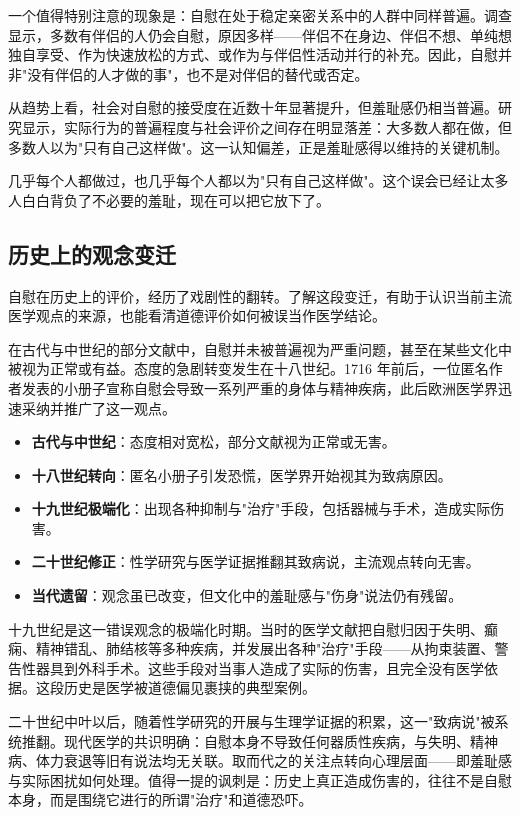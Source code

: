 \documentclass[12pt,UTF8]{ctexbook}
\newcommand{\keyword}[1]{\textbf{#1}}
\begin{document}
一个值得特别注意的现象是：自慰在处于稳定亲密关系中的人群中同样普遍。调查显示，多数有伴侣的人仍会自慰，原因多样——伴侣不在身边、伴侣不想、单纯想独自享受、作为快速放松的方式、或作为与伴侣性活动并行的补充。因此，自慰并非"没有伴侣的人才做的事"，也不是对伴侣的替代或否定。

从趋势上看，社会对自慰的接受度在近数十年显著提升，但羞耻感仍相当普遍。研究显示，实际行为的普遍程度与社会评价之间存在明显落差：大多数人都在做，但多数人以为"只有自己这样做"。这一认知偏差，正是羞耻感得以维持的关键机制。

\begin{tcolorbox}[colback=pink!5!white,colframe=red!50!black,title=贴心小叮咛]
	几乎每个人都做过，也几乎每个人都以为"只有自己这样做"。这个误会已经让太多人白白背负了不必要的羞耻，现在可以把它放下了。
\end{tcolorbox}
\subsection{历史上的观念变迁}

自慰在历史上的评价，经历了戏剧性的翻转。了解这段变迁，有助于认识当前主流医学观点的来源，也能看清道德评价如何被误当作医学结论。

在古代与中世纪的部分文献中，自慰并未被普遍视为严重问题，甚至在某些文化中被视为正常或有益。态度的急剧转变发生在十八世纪。1716 年前后，一位匿名作者发表的小册子宣称自慰会导致一系列严重的身体与精神疾病，此后欧洲医学界迅速采纳并推广了这一观点。

\begin{itemize}
	\item \keyword{古代与中世纪}：态度相对宽松，部分文献视为正常或无害。
	\item \keyword{十八世纪转向}：匿名小册子引发恐慌，医学界开始视其为致病原因。
	\item \keyword{十九世纪极端化}：出现各种抑制与"治疗"手段，包括器械与手术，造成实际伤害。
	\item \keyword{二十世纪修正}：性学研究与医学证据推翻其致病说，主流观点转向无害。
	\item \keyword{当代遗留}：观念虽已改变，但文化中的羞耻感与"伤身"说法仍有残留。
\end{itemize}

十九世纪是这一错误观念的极端化时期。当时的医学文献把自慰归因于失明、癫痫、精神错乱、肺结核等多种疾病，并发展出各种"治疗"手段——从拘束装置、警告性器具到外科手术。这些手段对当事人造成了实际的伤害，且完全没有医学依据。这段历史是医学被道德偏见裹挟的典型案例。

二十世纪中叶以后，随着性学研究的开展与生理学证据的积累，这一"致病说"被系统推翻。现代医学的共识明确：自慰本身不导致任何器质性疾病，与失明、精神病、体力衰退等旧有说法均无关联。取而代之的关注点转向心理层面——即羞耻感与实际困扰如何处理。值得一提的讽刺是：历史上真正造成伤害的，往往不是自慰本身，而是围绕它进行的所谓"治疗"和道德恐吓。
\end{document}
